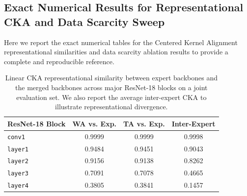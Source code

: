 \documentclass{article}
\theoremstyle{plain}
\theoremstyle{definition}
\begin{document}
\subsection{Exact Numerical Results for Representational CKA and Data Scarcity Sweep}
Here we report the exact numerical tables for the Centered Kernel Alignment representational similarities and data scarcity ablation results to provide a complete and reproducible reference.

\begin{table}[ht]
\caption{Linear CKA representational similarity between expert backbones and the merged backbones across major ResNet-18 blocks on a joint evaluation set. We also report the average inter-expert CKA to illustrate representational divergence.}
\label{tab:cka_results}
\begin{center}
\begin{scriptsize}
\setlength{\tabcolsep}{3.0pt}
\begin{tabular}{lccc}
\toprule
\textbf{ResNet-18 Block} & \textbf{WA vs. Exp.} & \textbf{TA vs. Exp.} & \textbf{Inter-Expert} \\
\midrule
\texttt{conv1}  & 0.9999 & 0.9999 & 0.9998 \\
\texttt{layer1} & 0.9484 & 0.9451 & 0.9043 \\
\texttt{layer2} & 0.9156 & 0.9138 & 0.8262 \\
\texttt{layer3} & 0.7091 & 0.7078 & 0.4665 \\
\texttt{layer4} & 0.3805 & 0.3841 & 0.1457 \\
\bottomrule
\end{tabular}
\end{scriptsize}
\end{center}
\end{table}
\end{document}
